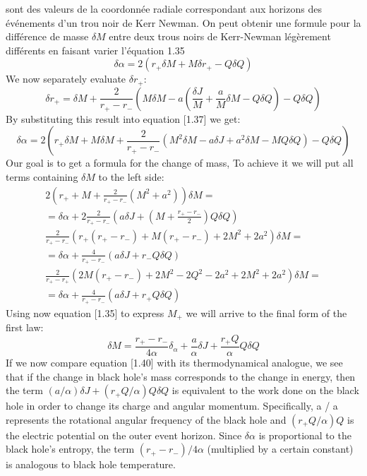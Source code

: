sont des valeurs de la coordonnée radiale correspondant aux horizons des événements d'un trou noir de Kerr Newman.  On peut obtenir une formule pour la différence de masse $\delta M$ entre deux trous noirs de Kerr-Newman légèrement différents en faisant varier l'équation 1.35
$$
\delta \alpha=2\left(r_{+} \delta M+M \delta r_{+}-Q \delta Q\right)
$$
We now separately evaluate $\delta r_{+}:$
$$
\delta r_{+}=\delta M+\frac{2}{r_{+}-r_{-}}\left(M \delta M-a\left(\frac{\delta J}{M}+\frac{a}{M} \delta M-Q \delta Q\right)-Q \delta Q\right)
$$
By substituting this result into equation [1.37] we get:
$$
\delta \alpha=2\left(r_{+} \delta M+M \delta M+\frac{2}{r_{+}-r_{-}}\left(M^{2} \delta M-a \delta J+a^{2} \delta M-M Q \delta Q\right)-Q \delta Q\right)
$$
Our goal is to get a formula for the change of mass, To achieve it we will put all terms containing $\delta M$ to the left side:
$$
\begin{array}{c}
2\left(r_{+}+M+\frac{2}{r_{+}-r_{-}}\left(M^{2}+a^{2}\right)\right) \delta M= \\
=\delta \alpha+2 \frac{2}{r_{+}-r_{-}}\left(a \delta J+\left(M+\frac{r_{+}-r_{-}}{2}\right) Q \delta Q\right) \\
\frac{2}{r_{+}-r_{-}}\left(r_{+}\left(r_{+}-r_{-}\right)+M\left(r_{+}-r_{-}\right)+2 M^{2}+2 a^{2}\right) \delta M= \\
=\delta \alpha+\frac{4}{r_{+}-r_{-}}\left(a \delta J+r_{-} Q \delta Q\right) \\
\frac{2}{r_{+}-r_{+}}\left(2 M\left(r_{+}-r_{-}\right)+2 M^{2}-2 Q^{2}-2 a^{2}+2 M^{2}+2 a^{2}\right) \delta M= \\
=\delta \alpha+\frac{4}{r_{+}-r_{-}}\left(a \delta J+r_{+} Q \delta Q\right)
\end{array}
$$
Using now equation [1.35] to express $M_{+}$ we will arrive to the final form of the first law:
$$
\delta M=\frac{r_{+}-r_{-}}{4 \alpha} \delta_{\alpha}+\frac{a}{\alpha} \delta J+\frac{r_{+} Q}{\alpha} Q \delta Q
$$
If we now compare equation [1.40] with its thermodynamical analogue, we see that if the change in black hole's mass corresponds to the change in energy, then the term $(a / \alpha) \delta J+\left(r_{+} Q / \alpha\right) Q \delta Q$ is equivalent to the work done on the black hole in order to change its charge and angular momentum. Specifically, a / a represents the rotational angular frequency of the black hole and $\left(r_{+} Q / \alpha\right) Q$ is the electric potential on the outer event horizon. Since $\delta \alpha$ is proportional to the black hole's entropy, the term $\left(r_{+}-r_{-}\right) / 4 \alpha$ (multiplied by a certain constant) is analogous to black hole temperature.

